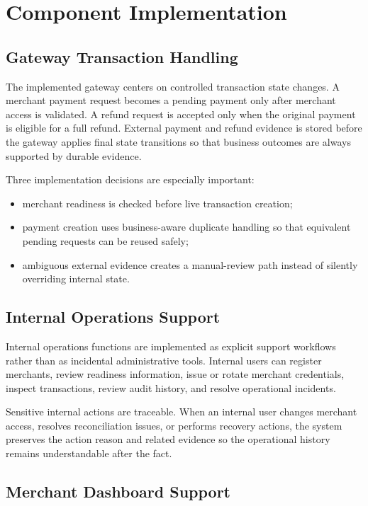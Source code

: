 \chapter{Component Implementation}

\section{Gateway Transaction Handling}

The implemented gateway centers on controlled transaction state changes. A
merchant payment request becomes a pending payment only after merchant access is
validated. A refund request is accepted only when the original payment is
eligible for a full refund. External payment and refund evidence is stored
before the gateway applies final state transitions so that business outcomes are
always supported by durable evidence.

Three implementation decisions are especially important:

\begin{itemize}
  \item merchant readiness is checked before live transaction creation;
  \item payment creation uses business-aware duplicate handling so that
  equivalent pending requests can be reused safely;
  \item ambiguous external evidence creates a manual-review path instead of
  silently overriding internal state.
\end{itemize}

\section{Internal Operations Support}

Internal operations functions are implemented as explicit support workflows
rather than as incidental administrative tools. Internal users can register
merchants, review readiness information, issue or rotate merchant credentials,
inspect transactions, review audit history, and resolve operational incidents.

Sensitive internal actions are traceable. When an internal user changes
merchant access, resolves reconciliation issues, or performs recovery actions,
the system preserves the action reason and related evidence so the operational
history remains understandable after the fact.

\section{Merchant Dashboard Support}

